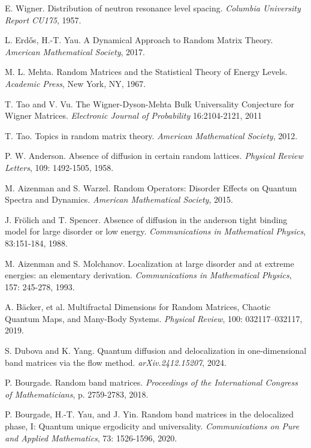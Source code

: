 \documentclass[11pt]{article}
\begin{document}
\begin{thebibliography}{99}

 E. Wigner. Distribution of neutron resonance level spacing. \textit{Columbia University Report CU175}, 1957.

 L. Erdős, H.-T. Yau. A Dynamical Approach to Random Matrix Theory. \textit{American Mathematical Society}, 2017.

 M. L. Mehta. Random Matrices and the Statistical Theory of Energy Levels. \textit{Academic Press},
New York, NY, 1967.

 T. Tao and V. Vu. The Wigner-Dyson-Mehta Bulk Universality Conjecture for Wigner Matrices. \textit{Electronic Journal of Probability} 16:2104-2121, 2011

 T. Tao. Topics in random matrix theory. \textit{American Mathematical Society}, 2012.

 P. W. Anderson. Absence of diffusion in certain random lattices. \textit{Physical Review Letters}, 109: 1492-1505, 1958.

 M. Aizenman and S. Warzel. Random Operators: Disorder Effects on Quantum Spectra and Dynamics. \textit{American Mathematical Society}, 2015.

 J. Frölich and T. Spencer. Absence of diffusion in the anderson tight binding model for large disorder or low energy. \textit{Communications in Mathematical Physics}, 83:151-184, 1988.

 M. Aizenman and S. Molchanov. Localization at large disorder and at extreme energies: an elementary derivation. \textit{Communications in Mathematical Physics}, 157: 245-278, 1993. 

 A. Bäcker, et al. Multifractal Dimensions for Random Matrices, Chaotic Quantum Maps, and Many-Body Systems. \textit{Physical Review}, 100: 032117–032117, 2019.


 S. Dubova and K. Yang. Quantum diffusion and delocalization in one-dimensional band matrices via the flow method. \textit{arXiv.2412.15207}, 2024.


 P. Bourgade. Random band matrices. \textit{Proceedings of the International Congress of Mathematicians}, p. 2759-2783, 2018.

 P. Bourgade, H.-T. Yau, and J. Yin. Random band matrices in the delocalized phase, I: Quantum unique ergodicity and universality. \textit{Communications on Pure and Applied Mathematics}, 73: 1526-1596, 2020.


\end{thebibliography}
\end{document}
